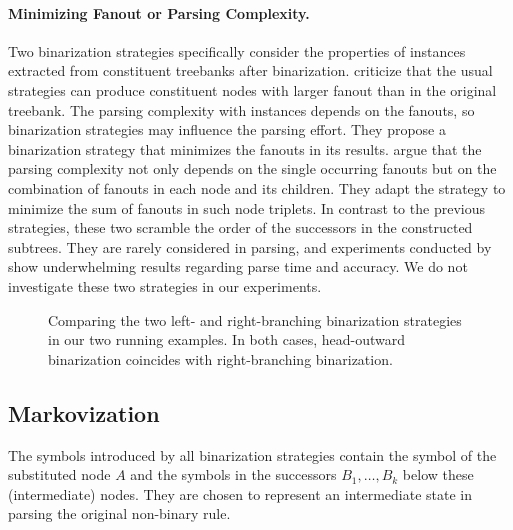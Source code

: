 \documentclass[../../document.tex]{subfiles}
\begin{document}
    \paragraph{Minimizing Fanout or Parsing Complexity.}
    Two binarization strategies specifically consider the properties of  instances extracted from constituent treebanks after binarization.
    \citet{gomez2009optimal} criticize that the usual strategies can produce constituent nodes with larger fanout than in the original treebank.
    The parsing complexity with  instances depends on the fanouts, so binarization strategies may influence the parsing effort.
    They propose a binarization strategy that minimizes the fanouts in its results.
    \citet{Gil10} argue that the parsing complexity not only depends on the single occurring fanouts but on the combination of fanouts in each node and its children.
    They adapt the strategy to minimize the sum of fanouts in such node triplets.
    In contrast to the previous strategies, these two scramble the order of the successors in the constructed subtrees.
    They are rarely considered in parsing, and experiments conducted by \citet{Cra12} show underwhelming results regarding parse time and accuracy.
    We do not investigate these two strategies in our experiments.

    \begin{figure}
        \resizebox{.3\linewidth}{!}{}\hfill
        \resizebox{.3\linewidth}{!}{}\hfill
        \resizebox{.3\linewidth}{!}{}

        \vspace{.5cm}

        \resizebox{.3\linewidth}{!}{}\hfill
        \resizebox{.3\linewidth}{!}{}\hfill
        \resizebox{.3\linewidth}{!}{}

        \caption{\label{fig:ex:binarization}
            Comparing the two left- and right-branching binarization strategies in our two running examples.
            In both cases, head-outward binarization coincides with right-branching binarization.
        }
    \end{figure}


    \subsection{Markovization}
    The symbols introduced by all binarization strategies contain the symbol of the substituted node \(A\) and the symbols in the successors \(B_1, \ldots, B_k\) below these (intermediate) nodes.
    They are chosen to represent an intermediate state in parsing the original non-binary rule.
\end{document}

